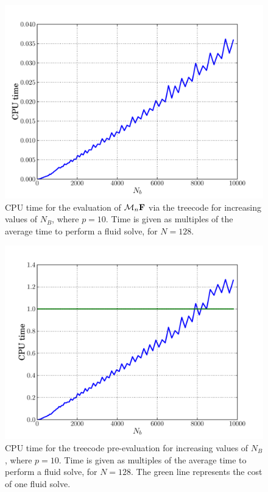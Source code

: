 \begin{figure}[!b]
	\begin{center}
		\includegraphics[bb=0in 0in 7.7in 6.3in,width=\StandardFigureWidth,clip]{Images_Methodology/Benchmark_Nb_EvalTime.pdf}
	\end{center}
	\caption{CPU time for the evaluation of $\mathcal{M}_n\mathbf{F}$ via the treecode for increasing values of $N_B$, where $p=10$. Time is given as multiples of the average time to perform a fluid solve, for $N=128$.}
	\label{fig:Benchmark_Nb_EvalTime}
\end{figure}

\begin{figure}[!b]
	\begin{center}
		\includegraphics[bb=0in 0in 7.7in 6.3in,width=\StandardFigureWidth,clip]{Images_Methodology/Benchmark_Nb_PreEvalTime.pdf}
	\end{center}
	\caption{CPU time for the treecode pre-evaluation for increasing values of $N_B$, where $p=10$. Time is given as multiples of the average time to perform a fluid solve, for $N=128$. The green line represents the cost of one fluid solve.}
	\label{fig:Benchmark_Nb_PreEvalTime}
\end{figure}

